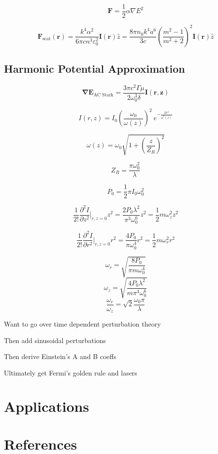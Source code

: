 \documentclass{article}
\newcommand{\p}{\partial}
\begin{document}
\[ \mathbf{F} = \frac{1}{2}\alpha\nabla E^2 \]

\[ \mathbf{F}_\text{scat}(\mathbf{r}) = \frac{k^4\alpha^2}{6\pi cn^3\varepsilon_0^2}\mathbf{I}(\mathbf{r})\hat{z} = \frac{8\pi n_0k^4a^6}{3c}\left( \frac{m^2-1}{m^2+2} \right)^2\mathbf{I}(\mathbf{r})\hat{z}  \]

\subsection*{Harmonic Potential Approximation}

\[ \mathbf{\nabla E}_\text{AC Stark} = \frac{3\pi c^2\Gamma\mu}{2\omega_0^3\delta}\mathbf{I(r,z)}  \]

\[ I(r,z) = I_0 \left( \frac{\omega_0}{\omega(z)} \right)^2\ e^{\displaystyle -\frac{2r^2}{\omega^2(z)}}  \]

\[ \omega(z) = \omega_0 \sqrt{1 + \left( \frac{z}{Z_R} \right)^2} \]

\[ Z_R = \frac{\pi\omega_0^2}{\lambda}  \]

\[ P_0 = \frac{1}{2} \pi I_0\omega_0^2 \]

\[ \frac{1}{2!}\frac{\p^2I}{\p z^2} \Bigg\vert_{r,z=0} z^2 = \frac{2P_0\lambda^2}{\pi^3\omega_0^6}z^2 = \frac{1}{2}m\omega_z^2z^2  \]

\[ \frac{1}{2!}\frac{\p^2I}{\p r^2} \Bigg\vert_{r,z=0} r^2 = \frac{4P_0}{\pi\omega_0^4}r^2 = \frac{1}{2}m\omega_r^2r^2  \]

\[ \omega_r = \sqrt{\frac{8P_0}{\pi m\omega_0^4}} \]
\[ \omega_z = \sqrt{\frac{4P_0\lambda^2}{m\pi^3\omega_0^6}} \]
\[ \frac{\omega_r}{\omega_z} = \sqrt{2}\frac{\omega_0\pi}{\lambda}  \]



Want to go over time dependent perturbation theory


Then add sinusoidal perturbations


Then derive Einstein's A and B coeffs


Ultimately get Fermi's golden rule and lasers

\section*{Applications}


\newpage
\section*{References}

\end{document}
